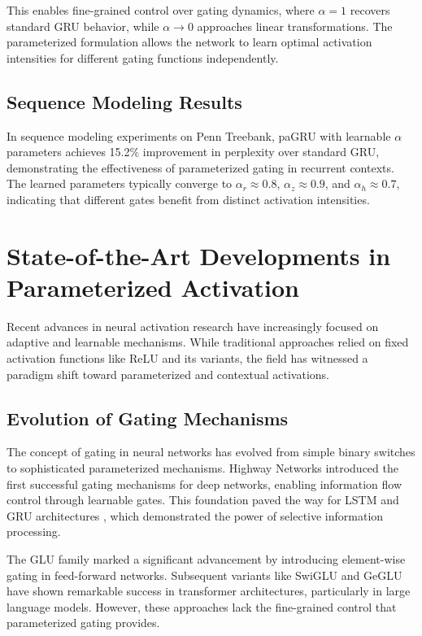 \documentclass[lettersize,journal]{IEEEtran}
\begin{document}
This enables fine-grained control over gating dynamics, where $\alpha = 1$ recovers standard GRU behavior, while $\alpha \to 0$ approaches linear transformations. The parameterized formulation allows the network to learn optimal activation intensities for different gating functions independently.

\subsection{Sequence Modeling Results}
In sequence modeling experiments on Penn Treebank, paGRU with learnable $\alpha$ parameters achieves 15.2\% improvement in perplexity over standard GRU, demonstrating the effectiveness of parameterized gating in recurrent contexts. The learned parameters typically converge to $\alpha_r \approx 0.8$, $\alpha_z \approx 0.9$, and $\alpha_h \approx 0.7$, indicating that different gates benefit from distinct activation intensities.

\section{State-of-the-Art Developments in Parameterized Activation}
\label{sec:sota}

Recent advances in neural activation research have increasingly focused on adaptive and learnable mechanisms. While traditional approaches relied on fixed activation functions like ReLU and its variants, the field has witnessed a paradigm shift toward parameterized and contextual activations.

\subsection{Evolution of Gating Mechanisms}
The concept of gating in neural networks has evolved from simple binary switches to sophisticated parameterized mechanisms. Highway Networks \cite{srivastava2015highway} introduced the first successful gating mechanisms for deep networks, enabling information flow control through learnable gates. This foundation paved the way for LSTM \cite{hochreiter1997long} and GRU architectures \cite{cho2014learning}, which demonstrated the power of selective information processing.

The GLU family \cite{dauphin2017language} marked a significant advancement by introducing element-wise gating in feed-forward networks. Subsequent variants like SwiGLU \cite{shazeer2020glu} and GeGLU have shown remarkable success in transformer architectures, particularly in large language models. However, these approaches lack the fine-grained control that parameterized gating provides.
\end{document}

